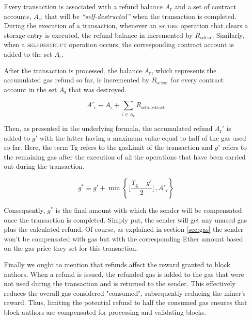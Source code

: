 Every transaction is associated with a refund balance $A_{\mathrm{r}}$ and a set of contract accounts, $A_{\mathrm{s}}$, that will be \emph{``self-destructed''} when the transaction is completed. During the execution of a transaction, whenever an \textsc{sstore} operation that clears a storage entry is executed, the refund balance in incremented by $R_{\mathrm{sclear}}$. Similarly, when a \textsc{selfdestruct} operation occurs, the corresponding contract account is added to the set $A_{\mathrm{s}}$.

After the transaction is processed, the balance $A_{\mathrm{r}}$, which represents the accumulated gas refund so far, is incremented by $R_{\mathrm{sclear}}$ for every contract account in the set $A_{\mathrm{s}}$ that was destroyed.

\begin{equation}
	A'_{\mathrm{r}} \equiv A_{\mathrm{r}} + \sum_{i \in A_{\mathbf{s}}} R_{\mathrm{selfdestruct}}
\end{equation}

Then, as presented in the underlying formula, the accumulated refund $A_{\mathrm{r}}'$ is added to $g'$ with the latter having a maximum value equal to half of the gas used so far. Here, the term Tg refers to the gasLimit of the transaction and $g'$ refers to the remaining gas after the execution of all the operations that have been carried out during the transaction.

\begin{equation}
g^* \equiv g' + \min \left\{ \Big\lfloor \dfrac{T_{\mathrm{g}} - g'}{2} \Big\rfloor, A'_{\mathrm{r}} \right\}
\end{equation}

Consequently, $g^*$ is the final amount with which the sender will be compensated once the transaction is completed. Simply put, the sender will get any unused gas plus the calculated refund. Of course, as explained in section \ref{sec:gas} the sender won't be compensated with gas but with the corresponding Ether amount based on the gas price they set for this transaction.

Finally we ought to mention that refunds affect the reward granted to block authors. When a refund is issued, the refunded gas is added to the gas that were not used during the transaction and is returned to the sender. This effectively reduces the overall gas considered "consumed", subsequently reducing the miner's reward. Thus, limiting the potential refund to half the consumed gas ensures that block authors are compensated for processing and validating blocks.

